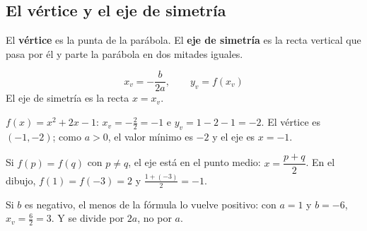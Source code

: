 \subsection{El vértice y el eje de simetría}
El \textbf{vértice} es la punta de la parábola. El \textbf{eje de simetría} es la recta vertical que pasa por él y parte la parábola en dos mitades iguales.
\begin{clave}[Vértice] $$x_v = -\frac{b}{2a},\qquad y_v = f(x_v)$$ El eje de simetría es la recta $x = x_v$.\end{clave}
\par\noindent\begin{minipage}{0.55\linewidth}
\begin{ejemplo} $f(x) = x^2 + 2x - 1$: $x_v = -\frac{2}{2} = -1$ e $y_v = 1 - 2 - 1 = -2$. El vértice es $(-1, -2)$; como $a > 0$, el valor mínimo es $-2$ y el eje es $x = -1$.\end{ejemplo}
\begin{clave} Si $f(p) = f(q)$ con $p \neq q$, el eje está en el punto medio: $x = \dfrac{p + q}{2}$. En el dibujo, $f(1) = f(-3) = 2$ y $\frac{1 + (-3)}{2} = -1$.\end{clave}
\end{minipage}\hfill
\begin{minipage}{0.4\linewidth}\centering
{}
\end{minipage}
\begin{ojo} Si $b$ es negativo, el menos de la fórmula lo vuelve positivo: con $a = 1$ y $b = -6$, $x_v = \frac{6}{2} = 3$. Y se divide por $2a$, no por $a$.\end{ojo}

